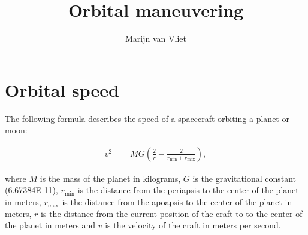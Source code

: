 \documentclass[a4paper, 11pt]{space}
\author{Marijn van Vliet}
\title{Orbital maneuvering}
\begin{document}
\maketitle

\section{Orbital speed}\label{orbital_speed}

The following formula describes the speed of a spacecraft orbiting a planet or moon:
\begin{center}
\end{center}
\begin{align}
    v^2 &= MG \left( \frac{2}{r} - \frac{2}{r_\mathrm{min} + r_\mathrm{max}} \right),
\end{align}

where $M$ is the mass of the planet in kilograms, $G$ is the gravitational constant (\num{6.67384E-11}), $r_\mathrm{min}$ is the distance from the periapsis to the center of the planet in meters, $r_\mathrm{max}$ is the distance from the apoapsis to the center of the planet in meters, $r$ is the distance from the current position of the craft to to the center of the planet in meters and $v$ is the velocity of the craft in meters per second. 
\end{document}

